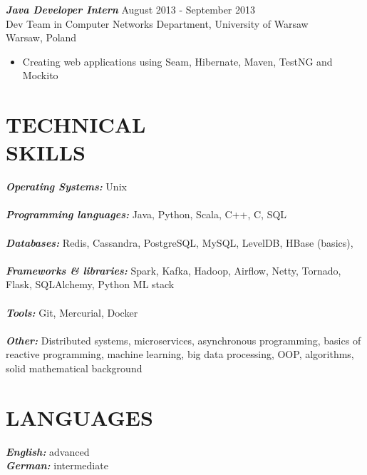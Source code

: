 \documentclass[margin, 10pt]{res} %
\begin{document}
\begin{resume}
{\sl \bf Java Developer Intern } \hfill August 2013 - September 2013 \\
Dev Team in Computer Networks Department, University of Warsaw \\
Warsaw, Poland
\begin{itemize} 
\item Creating web applications using Seam, Hibernate, Maven, TestNG and Mockito
\end{itemize}


\section{TECHNICAL \\ SKILLS} 

{\sl \bf Operating Systems:} Unix \\ \\
{\sl \bf Programming languages:}
Java, Python, Scala, C++, C, SQL \\ \\ 
{\sl \bf Databases:} Redis, Cassandra, PostgreSQL, MySQL, LevelDB, HBase (basics),  \\ \\
{\sl \bf Frameworks \& libraries:} Spark, Kafka, Hadoop, Airflow, Netty, Tornado, Flask, SQLAlchemy, Python ML stack \\ \\
{\sl \bf Tools:} Git, Mercurial, Docker \\ \\
{\sl \bf Other:} Distributed systems, microservices, asynchronous programming, basics of reactive programming, machine learning, big data processing, OOP, algorithms, solid mathematical background


\section{ LANGUAGES } 

{\sl \bf English:} advanced \\
{\sl \bf German:} intermediate


\end{resume}
\end{document}
